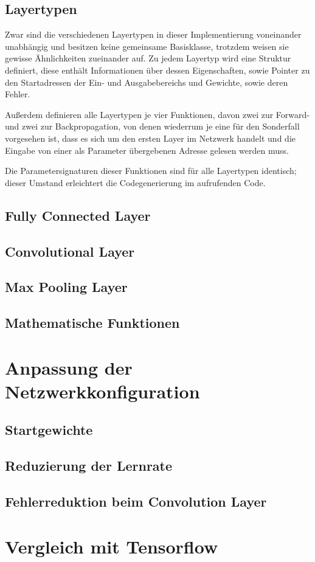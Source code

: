 \documentclass[../main.tex]{subfiles}
\begin{document}
\subsection{Layertypen}
Zwar sind die verschiedenen Layertypen in dieser Implementierung voneinander unabhängig und besitzen keine gemeinsame Basisklasse, trotzdem weisen sie gewisse Ähnlichkeiten zueinander auf. Zu jedem Layertyp wird eine Struktur definiert, diese enthält Informationen über dessen Eigenschaften, sowie Pointer zu den Startadressen der Ein- und Ausgabebereichs und Gewichte, sowie deren Fehler. 

Außerdem definieren alle Layertypen je vier Funktionen, davon zwei zur Forward- und zwei zur Backpropagation, von denen wiederrum je eine für den Sonderfall vorgesehen ist, dass es sich um den ersten Layer im Netzwerk handelt und die Eingabe von einer als Parameter übergebenen Adresse gelesen werden muss. 

Die Parametersignaturen dieser Funktionen sind für alle Layertypen identisch; dieser Umstand erleichtert die Codegenerierung im aufrufenden Code. 

\subsection{Fully Connected Layer}


\subsection{Convolutional Layer}


\subsection{Max Pooling Layer}


\subsection{Mathematische Funktionen}


\section{Anpassung der Netzwerkkonfiguration}

\subsection{Startgewichte}

\subsection{Reduzierung der Lernrate}

\subsection{Fehlerreduktion beim Convolution Layer}


\section{Vergleich mit Tensorflow}
\end{document}
